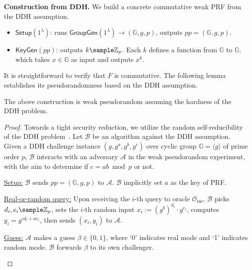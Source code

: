 \documentclass[a4paper,10pt]{article}
\begin{document}
\begin{trivlist}
\item \textbf{Construction from DDH.} We build a concrete commutative weak PRF from the DDH assumption. 
\begin{itemize}
\item $\mathsf{Setup}(1^\lambda)$: runs $\mathsf{GroupGen}(1^\lambda) \rightarrow (\mathbb{G}, g, p)$, 
    outputs $pp = (\mathbb{G}, g, p)$. 

\item $\mathsf{KeyGen}(pp)$: outputs $k \sample \mathbb{Z}_p$. 
    Each $k$ defines a function from $\mathbb{G}$ to $\mathbb{G}$, 
    which takes $x \in \mathbb{G}$ as input and outputs $x^k$. 
\end{itemize}
It is straightforward to verify that $F$ is commutative. 
The following lemma establishes its pseudorandomness based on the DDH assumption. 

\begin{lemma}
The above construction is weak pseudorandom assuming the hardness of the DDH problem.
\end{lemma} 

\begin{proof}
Towards a tight security reduction, 
we utilize the random self-reducibility of the DDH problem~\cite{NR-FOCS-1995}. 
Let $\mathcal{B}$ be an algorithm against the DDH assumption.  
Given a DDH challenge instance $(g, g^a, g^b, g^c)$ over cyclic group $\mathbb{G} = \langle g \rangle$ of prime order $p$, 
$\mathcal{B}$ interacts with an adversary $\mathcal{A}$
in the weak pseudorandom experiment, with the aim to determine if $c = ab \bmod p$ or not. 

\begin{trivlist}
\item \underline{Setup:} $\mathcal{B}$ sends $pp = (\mathbb{G}, g, p)$ to $\mathcal{A}$. 
    $\mathcal{B}$ implicitly set $a$ as the key of PRF. 

\item \underline{Real-or-random query:} Upon receiving the $i$-th query to oracle $\mathcal{O}_\mathsf{ror}$, 
    $\mathcal{B}$ picks $d_i, e_i \sample \mathbb{Z}_p$, 
    sets the $i$-th random input $x_i := (g^b)^{d_i} \cdot g^{e_i}$, 
    computes $y_i = g^{cd_i+ae_i}$, then sends $(x_i, y_i)$ to $\mathcal{A}$.

\item \underline{Guess:} $\mathcal{A}$ makes a guess $\beta \in \{0,1\}$, 
    where `0' indicates real mode and `1' indicates random mode. 
    $\mathcal{B}$ forwards $\beta$ to its own challenger.    
\end{trivlist}


\end{proof}
\end{trivlist}
\end{document}
